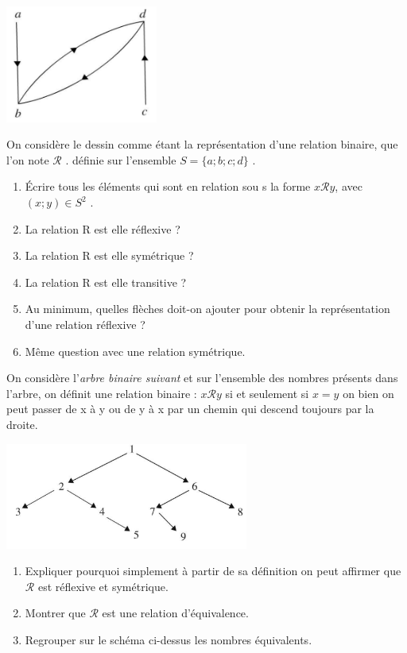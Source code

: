 \documentclass[a4paper,12pt]{article}
\begin{document}
	
\exo{}



\exo{}

\begin{center}
	\includegraphics[width=5cm]{graphe.PNG}
\end{center}


On considère le dessin comme étant la représentation d'une relation binaire, que l'on note $\mathcal{R}$ . définie sur l'ensemble $S = \{ a;b;c;d\}$ .

\begin{enumerate}[\bfseries a.]
	\item 	Écrire tous les éléments qui sont en relation sou s la forme $x\mathcal{R}y$, avec $(x;y) \in S^2$ .
	\item 	La relation R est elle réflexive ?	
	\item 	La relation R est elle symétrique ?
	\item 	La relation R est elle transitive ?
	\item 	Au minimum, quelles flèches doit-on ajouter pour obtenir la représentation d'une
	relation réflexive ?
	\item Même question avec une relation symétrique. \\
\end{enumerate}
\exo{}

On considère l'\textit{arbre binaire suivant} et sur l'ensemble des nombres présents dans l'arbre, on définit une relation binaire : $x\mathcal{R}y$ si et seulement si $x=y$ on bien on peut passer de x à y ou de y à x par un chemin qui descend toujours par la droite.
\begin{center}
	\includegraphics[width=8cm]{arbre.PNG}
\end{center}
\begin{enumerate}[\bfseries 1.]
	\item 	Expliquer pourquoi simplement à partir de sa définition on peut affirmer que $\mathcal{R}$ est réflexive et symétrique.
	\item 	Montrer que $\mathcal{R}$ est une relation d'équivalence.
	\item 	Regrouper sur le schéma ci-dessus les nombres équivalents.
\end{enumerate}
\end{document}
